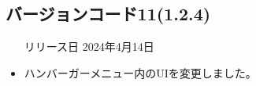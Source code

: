 \subsection*{バージョンコード11(1.2.4)}
\begin{itemize}
    \item[リリース日] 2024年4月14日
\end{itemize}

\new \par
\change
\begin{itemize}
    \item ハンバーガーメニュー内のUIを変更しました。
\end{itemize}

\fix
